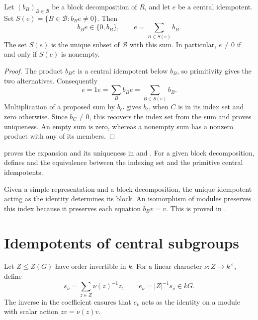 \begin{proposition}
\label{lib:blocks:idempotent-expansion}
Let $(b_B)_{B\in\mathcal B}$ be a block decomposition of $R$, and let
$e$ be a central idempotent. Set $S(e)=\{B\in\mathcal B:b_Be\ne0\}$. Then
\[
 b_Be\in\{0,b_B\},\qquad
 e=\sum_{B\in S(e)}b_B.
\]
The set $S(e)$ is the unique subset of $\mathcal B$ with this sum.
In particular, $e\ne0$ if and only if $S(e)$ is nonempty.
\end{proposition}
\begin{proof}
The product $b_Be$ is a central idempotent below $b_B$, so primitivity
gives the two alternatives. Consequently
\[
 e=1e=\sum_B b_Be=\sum_{B\in S(e)}b_B.
\]
Multiplication of a proposed sum by $b_C$ gives $b_C$ when $C$ is in
its index set and zero otherwise. Since $b_C\ne0$, this recovers the
index set from the sum and proves uniqueness. An empty sum is zero,
whereas a nonempty sum has a nonzero product with any of its members.
\end{proof}

\begin{implementation}
 proves the expansion
and its uniqueness in
and .
For a given block decomposition,
 defines
 and the equivalence 
between the indexing set and the primitive central idempotents.
\end{implementation}

\begin{example}
Given a simple representation and a block decomposition, the unique
idempotent acting as the identity determines its block. An isomorphism of modules
preserves this index because it preserves each equation $b_Bv=v$.
This is proved in
.
\end{example}

\section{Idempotents of central subgroups}
\label{lib:blocks:central-sectors}

Let $Z\leq Z(G)$ have order invertible in $k$. For a linear character
$\nu:Z\to k^\times$, define
\[
 s_\nu=\sum_{z\in Z}\nu(z)^{-1}z,
 \qquad e_\nu=|Z|^{-1}s_\nu\in kG.
\]
The inverse in the coefficient ensures that $e_\nu$ acts as the identity
on a module with scalar action $zv=\nu(z)v$.

